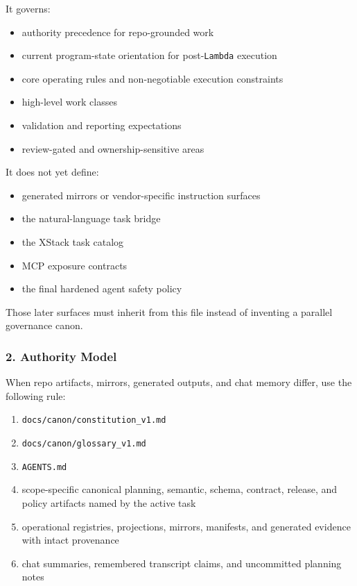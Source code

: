 \documentclass[9pt,a4paper,openany]{book}
\begin{document}
It governs:


\begin{itemize}
\item authority precedence for repo-\allowbreak{}grounded work
\item current program-\allowbreak{}state orientation for post-\allowbreak{}\texttt{Lambda} execution
\item core operating rules and non-\allowbreak{}negotiable execution constraints
\item high-\allowbreak{}level work classes
\item validation and reporting expectations
\item review-\allowbreak{}gated and ownership-\allowbreak{}sensitive areas
\end{itemize}

It does not yet define:


\begin{itemize}
\item generated mirrors or vendor-\allowbreak{}specific instruction surfaces
\item the natural-\allowbreak{}language task bridge
\item the XStack task catalog
\item MCP exposure contracts
\item the final hardened agent safety policy
\end{itemize}

Those later surfaces must inherit from this file instead of inventing a parallel governance canon.\allowbreak{}


\subsubsection{2. Authority Model}

When repo artifacts, mirrors, generated outputs, and chat memory differ, use the following rule:


\begin{enumerate}
\item \texttt{docs/\allowbreak{}canon/\allowbreak{}constitution\_\allowbreak{}v1.\allowbreak{}md}
\item \texttt{docs/\allowbreak{}canon/\allowbreak{}glossary\_\allowbreak{}v1.\allowbreak{}md}
\item \texttt{AGENTS.\allowbreak{}md}
\item scope-\allowbreak{}specific canonical planning, semantic, schema, contract, release, and policy artifacts named by the active task
\item operational registries, projections, mirrors, manifests, and generated evidence with intact provenance
\item chat summaries, remembered transcript claims, and uncommitted planning notes
\end{enumerate}
\end{document}
